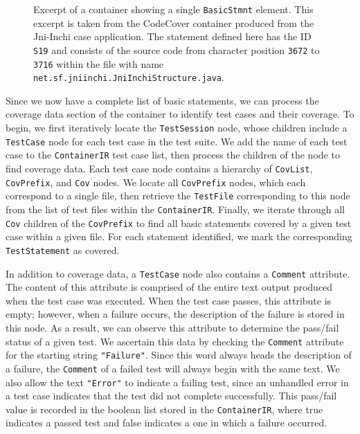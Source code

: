 \begin{figure}[tb]
\centering

\caption{Excerpt of a container showing a single \texttt{BasicStmnt} element.  This excerpt is taken
from the CodeCover container produced from the Jni-Inchi case application.  The statement defined here
has the ID \texttt{S19} and consists of the source code from character position \texttt{3672} to 
\texttt{3716} within the file with name \texttt{net.sf.jniinchi.JniInchiStructure.java}.}
\label{fig:xml-basic}
\end{figure}

Since we now have a complete list of basic statements, we can process the coverage data section
of the container to identify test cases and their coverage.  To begin, we first iteratively 
locate the \texttt{TestSession} node, whose children include a \texttt{TestCase} node for
each test case in the test suite.  We add the name of each test case to the \texttt{ContainerIR}
test case list, then process the children of the node to find coverage data.  Each test case
node contains a hierarchy of \texttt{CovList}, \texttt{CovPrefix}, and \texttt{Cov} nodes.  We 
locate all \texttt{CovPrefix} nodes, which each correspond to a single file, then retrieve the
\texttt{TestFile} corresponding to this node from the list of test files within the \texttt{ContainerIR}.
Finally, we iterate through all \texttt{Cov} children of the \texttt{CovPrefix} to find all 
basic statements covered by a given test case within a given file.  For each statement identified,
we mark the corresponding \texttt{TestStatement} as covered.

In addition to coverage data, a \texttt{TestCase} node also contains a \texttt{Comment} attribute.
The content of this attribute is comprised of the entire text output produced when the test case
was executed.  When the test case passes, this attribute is empty; however, when a failure occurs,
the description of the failure is stored in this node.  As a result, we can observe this attribute
to determine the pass/fail status of a given test.  We ascertain this data by checking the
\texttt{Comment} attribute for the starting string \texttt{"Failure"}.  Since this word always
heads the description of a failure, the \texttt{Comment} of a failed test will always begin with
the same text.  We also allow the text \texttt{"Error"} to indicate a failing test, since an unhandled
error in a test case indicates that the test did not complete successfully.  This pass/fail value is
recorded in the boolean list stored in the \texttt{ContainerIR}, where true indicates a passed test and
false indicates a one in which a failure occurred.

